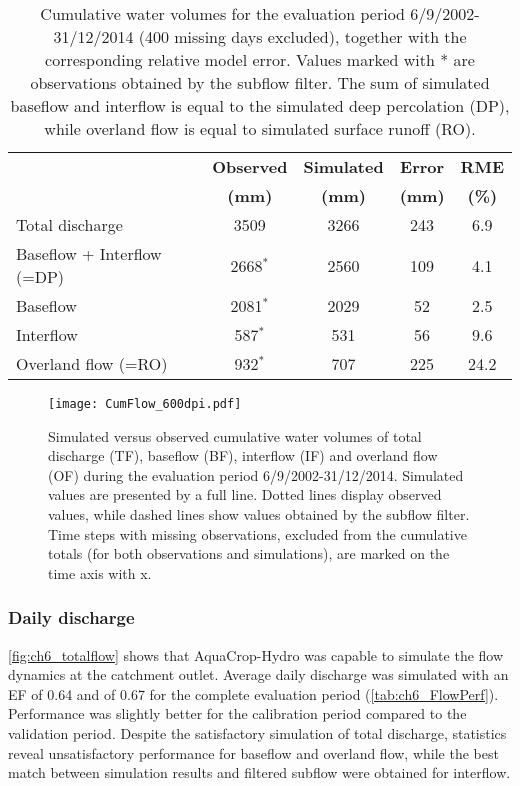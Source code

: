 \begin{table}[htbp]
  	\caption{Cumulative water volumes for the evaluation period 6/9/2002-31/12/2014 (400 missing days excluded), together with the corresponding relative model error. Values marked with * are observations obtained by the subflow filter. The sum of simulated baseflow and interflow is equal to the simulated deep percolation (DP), while overland flow is equal to simulated surface runoff (RO).}
\begin{tabular}{lcccc}
\toprule
\multirow{2}[2]{*}{\textbf{}} & \textbf{Observed} & \textbf{Simulated} & \textbf{Error} & \textbf{RME} \\
      & \textbf{(mm)} & \textbf{(mm)} & \textbf{(mm)} & \textbf{(\%)} \\
\midrule
Total discharge & 3509 & 3266  & 243   & 6.9 \\
Baseflow + Interflow (=DP) & 2668$^\ast$ & 2560  & 109   & 4.1 \\
Baseflow & 2081$^\ast$ & 2029  & 52    & 2.5 \\
Interflow & 587$^\ast$  & 531   & 56    & 9.6 \\
Overland flow (=RO) & 932$^\ast$  & 707   & 225   & 24.2 \\
\bottomrule
\end{tabular}%
  \label{tab:ch6_FlowBal}%
  \end{table}

 \begin{figure}[tbhp]
	\centering
		\texttt{[image: CumFlow\_600dpi.pdf]}
	\caption{Simulated versus observed cumulative water volumes of total discharge (TF), baseflow (BF), interflow (IF) and overland  flow (OF) during the evaluation period 6/9/2002-31/12/2014. Simulated values are presented by a full line. Dotted lines display observed values, while dashed lines show values obtained by the subflow filter. Time steps with missing observations, excluded from the cumulative totals (for both observations and simulations), are marked on the time axis with x.}
	\label{fig:ch6_cumflow}
\end{figure}


\subsubsection{Daily discharge}
\autoref{fig:ch6_totalflow}  shows that AquaCrop-Hydro was capable to simulate the flow dynamics at the catchment outlet. Average daily discharge was simulated with an EF of 0.64 and \Rsq of 0.67 for the complete evaluation period (\autoref{tab:ch6_FlowPerf}). Performance was slightly better for the calibration period compared to the validation period. Despite the satisfactory simulation of total discharge, statistics reveal unsatisfactory performance for baseflow and overland flow, while the best match between simulation results and filtered subflow were obtained for interflow.

